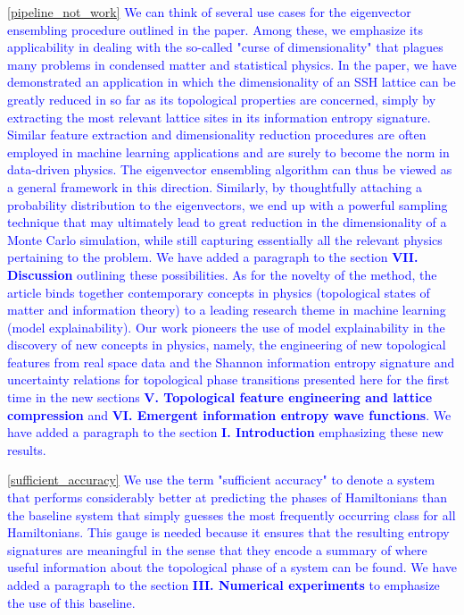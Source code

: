 \documentclass[10pt]{revtex4-1}
\newcommand{\citequote}[1]{\ref{#1}}
\begin{document}
\vspace{0.25cm}
\textcolor{blue}{\citequote{pipeline_not_work} We can think of several use cases for the eigenvector ensembling procedure outlined in the paper. Among these, we emphasize its applicability in dealing with the so-called "curse of dimensionality" that plagues many problems in condensed matter and statistical physics. In the paper, we have demonstrated an application in which the dimensionality of an SSH lattice can be greatly reduced in so far as its topological properties are concerned, simply by extracting the most relevant lattice sites in its information entropy signature. Similar feature extraction and dimensionality reduction procedures are often employed in machine learning applications and are surely to become the norm in data-driven physics. The eigenvector ensembling algorithm can thus be viewed as a general framework in this direction. Similarly, by thoughtfully attaching a probability distribution to the eigenvectors, we end up with a powerful sampling technique that may ultimately lead to great reduction in the dimensionality of a Monte Carlo simulation, while still capturing essentially all the relevant physics pertaining to the problem. We have added a paragraph to the section \textbf{VII. Discussion} outlining these possibilities. As for the novelty of the method, the article binds together contemporary concepts in physics (topological states of matter and information theory) to a leading research theme in machine learning (model explainability). Our work pioneers the use of model explainability in the discovery of new concepts in physics, namely, the engineering of new topological features from real space data and the Shannon information entropy signature and uncertainty relations for topological phase transitions presented here for the first time in the new sections \textbf{V. Topological feature engineering and lattice compression} and \textbf{VI. Emergent information entropy wave functions}. We have added a paragraph to the section \textbf{I. Introduction} emphasizing these new results.  
}  

\textcolor{blue}{\citequote{sufficient_accuracy} We use the term "sufficient accuracy" to denote a system that performs considerably better at predicting the phases of Hamiltonians than the baseline system that simply guesses the most frequently occurring class for all Hamiltonians. This gauge is needed because it ensures that the resulting entropy signatures are meaningful in the sense that they encode a summary of where useful information about the topological phase of a system can be found. We have added a paragraph to the section \textbf{III. Numerical experiments} to emphasize the use of this baseline.}  
\end{document}
